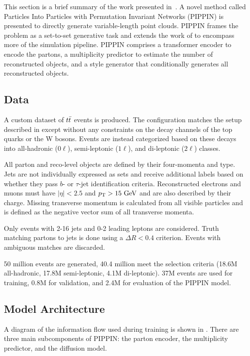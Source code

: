 This section is a brief summary of the work presented in~\textcite{PIPPIN}.
A novel method called Particles Into Particles with Permutation Invariant Networks (PIPPIN) is presented to directly generate variable-length point clouds.
PIPPIN frames the problem as a set-to-set generative task and extends the work of \pcdroid to encompass more of the simulation pipeline.
PIPPIN comprises a transformer encoder to encode the partons, a multiplicity predictor to estimate the number of reconstructed objects, and a \pcdroid style generator that conditionally generates all reconstructed objects.

\subsection{Data}

A custom dataset of $t\bar{t}$ events is produced.
The configuration matches the setup described in  except without any constraints on the decay channels of the top quarks or the W bosons.
Events are instead categorized based on these decays into all-hadronic ($0\ell$), semi-leptonic ($1\ell$), and di-leptonic ($2\ell$) classes.

All parton and reco-level objects are defined by their four-momenta and type.
Jets are not individually expressed as sets and receive additional labels based on whether they pass $b$- or $\tau$-jet identification criteria.
Reconstructed electrons and muons must have $|\eta| < 2.5$ and $\pt > 15~\GeV$ and are also described by their charge.
Missing transverse momentum \ptmiss is calculated from all visible particles and is defined as the negative vector sum of all transverse momenta.

Only events with 2-16 jets and 0-2 leading leptons are considered.
Truth matching partons to jets is done using a $\Delta R < 0.4$ criterion.
Events with ambiguous matches are discarded.

50 million events are generated, 40.4 million meet the selection criteria (18.6M all-hadronic, 17.8M semi-leptonic, 4.1M di-leptonic).
37M events are used for training, 0.8M for validation, and 2.4M for evaluation of the PIPPIN model.

\subsection{Model Architecture}

A diagram of the information flow used during training is shown in .
There are three main subcomponents of PIPPIN: the parton encoder, the multiplicity predictor, and the diffusion model.

